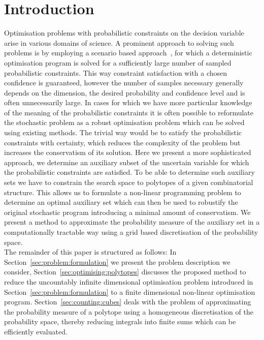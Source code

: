\documentclass[letterpaper, 10pt, conference]{ieeeconf} %
\begin{document}
\section{Introduction}\label{sec:intro}%
%
%
%
%
%
\noindent Optimisation problems with probabilistic constraints on the decision variable arise in various domains of science.
%
A prominent approach to solving such problems is by employing a scenario based approach~\cite{Calafiore:2010}, for which a deterministic optimisation program is solved for a sufficiently large number of sampled probabilistic constraints.
%
This way constraint satisfaction with a chosen confidence is guaranteed, however the number of samples necessary generally depends on the dimension, the desired probability and confidence level and is often unnecessarily large.
%
In cases for which we have more particular knowledge of the meaning of the probabilistic constraints it is often possible to reformulate the stochastic problem as a robust optimisation problem which can be solved using existing methods.
%
The trivial way would be to satisfy the probabilistic constraints with certainty, which reduces the complexity of the problem but increases the conservatism of its solution.
%
Here we present a more sophisticated approach, we determine an auxiliary subset of the uncertain variable for which the probabilistic constraints are satisfied.
%
To be able to determine such auxiliary sets we have to constrain the search space to polytopes of a given combinatorial structure.
%
This allows us to formulate a non-linear programming problem to determine an optimal auxiliary set which can then be used to robustify the original stochastic program introducing a minimal amount of conservatism.
%
We present a method to approximate the probability measure of the auxiliary set in a computationally tractable way using a grid based discretisation of the probability space.
%
\\[1em]
%
The remainder of this paper is structured as follows:
%
In Section~\ref{sec:problem:formulation} we present the problem description we consider, Section~\ref{sec:optimising:polytopes} discusses the proposed method to reduce the uncountably infinite dimensional optimisation problem introduced in Section~\ref{sec:problem:formulation} to a finite dimensional non-linear optimisation program.
%
Section~\ref{sec:counting:cubes} deals with the problem of approximating the probability measure of a polytope using a homogeneous discretisation of the probability space, thereby reducing integrals into finite sums which can be efficiently evaluated.
\end{document}
